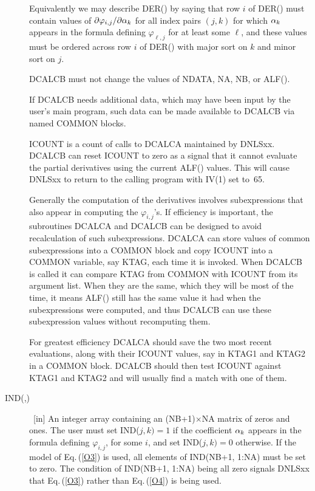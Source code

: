 \documentclass[twoside]{MATH77}
\begin{document}
\begin{description}
Equivalently we may describe DER() by saying that row $i$ of DER() must
contain values of $\partial \varphi _{i,j}/\partial {\bf \alpha }_k$ for all
index pairs $(j,k)$ for which ${\bf \alpha }_k$ appears in the formula
defining $\varphi _{\ell ,j}$ for at least some $\ell $, and these values must
be ordered across row $i$ of DER() with major sort on $k$ and minor sort on $%
j.$

DCALCB must not change the values of NDATA, NA, NB, or ALF().

If DCALCB needs additional data, which may have been input by the user's
main program, such data can be made available to DCALCB via named COMMON
blocks.

ICOUNT is a count of calls to DCALCA maintained by DNLSxx. DCALCB can
reset ICOUNT to zero as a signal that it cannot evaluate the partial
derivatives using the current ALF() values. This will cause DNLSxx to return
to the calling program with IV(1) set to~65.

Generally the computation of the derivatives involves subexpressions that
also appear in computing the $\varphi _{i,j}$'s. If efficiency is
important, the subroutines DCALCA and DCALCB can be designed to avoid
recalculation of such subexpressions. DCALCA can store values of common
subexpressions into a COMMON block and copy ICOUNT into a COMMON variable,
say KTAG, each time it is invoked. When DCALCB is called it can compare KTAG
from COMMON with ICOUNT from its argument list. When they are the same,
which they will be most of the time, it means ALF() still has the same value
it had when the subexpressions were computed, and thus DCALCB can use these
subexpression values without recomputing them.

For greatest efficiency DCALCA should save the two most recent evaluations,
along with their ICOUNT values, say in KTAG1 and KTAG2 in a COMMON block.
DCALCB should then test ICOUNT against KTAG1 and KTAG2 and will usually find
a match with one of them.

\item[IND(,)]  \ [in] An integer array containing an (NB+1)$\times $NA matrix
of zeros and ones. The user must set IND($j,k)=1$ if the coefficient ${\bf %
\alpha }_k$ appears in the formula defining $\varphi _{i,j}$, for some
$i$, and set IND($j,k)=0$ otherwise. If the model of Eq.\,(\ref{O3}) is used,
all elements of IND(NB+1, 1:NA) must be set to zero.  The condition
of IND(NB+1, 1:NA) being all zero signals DNLSxx that Eq.\,(\ref{O3}) rather
than Eq.\,(\ref{O4}) is being used.


\end{description}
\end{document}
